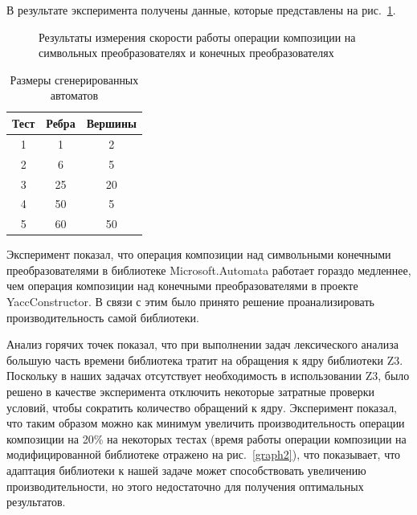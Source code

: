 В результате эксперимента получены данные, которые представлены на рис.~\ref{graph1}.

\begin{figure}[H]
\begin{center}
\end{center}

\caption{Результаты измерения скорости работы операции композиции на символьных преобразователях и конечных преобразователях}
\label{graph1}
\end{figure}

\begin{table}[H]
\begin{center}
\begin{tabular}{c|c|c}
Тест & Ребра & Вершины\\  
\hline 
1 & 1 & 2 \\
2 & 6 & 5 \\
3 & 25 & 20 \\
4 & 50 & 5 \\
5 & 60 & 50 \\

\end{tabular}
\caption{Размеры сгенерированных автоматов}
\label{table} 
\end{center}
\end{table} 

Эксперимент показал, что операция композиции над символьными конечными преобразователями в библиотеке Microsoft.Automata работает гораздо медленнее, чем операция композиции над конечными преобразователями в проекте YaccConstructor. В связи с этим было принято решение проанализировать производительность самой библиотеки. 

Анализ горячих точек показал, что при выполнении задач лексического анализа большую часть времени библиотека тратит на обращения к ядру библиотеки Z3. Поскольку в наших задачах отсутствует необходимость в использовании Z3, было решено в качестве эксперимента отключить некоторые затратные проверки условий, чтобы сократить количество обращений к ядру. Эксперимент показал, что таким образом можно как минимум увеличить производительность операции композиции на 20\% на некоторых тестах (время работы операции композиции на модифицированной библиотеке отражено на рис.~\ref{graph2}), что показывает, что адаптация библиотеки к нашей задаче может способствовать увеличению производительности, но этого недостаточно для получения оптимальных результатов.

